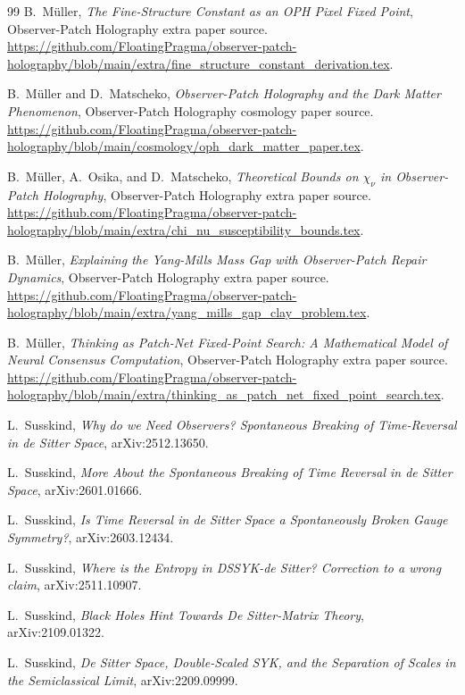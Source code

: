 \documentclass[11pt]{article}
\theoremstyle{remark}
\theoremstyle{plain}
\begin{document}
\begin{thebibliography}{99}
B.\ M\"uller,
\emph{The Fine-Structure Constant as an OPH Pixel Fixed Point},
Observer-Patch Holography extra paper source.
\url{https://github.com/FloatingPragma/observer-patch-holography/blob/main/extra/fine_structure_constant_derivation.tex}.

B.\ M\"uller and D.\ Matscheko,
\emph{Observer-Patch Holography and the Dark Matter Phenomenon},
Observer-Patch Holography cosmology paper source.
\url{https://github.com/FloatingPragma/observer-patch-holography/blob/main/cosmology/oph_dark_matter_paper.tex}.

B.\ M\"uller, A.\ Osika, and D.\ Matscheko,
\emph{Theoretical Bounds on \(\chi_\nu\) in Observer-Patch Holography},
Observer-Patch Holography extra paper source.
\url{https://github.com/FloatingPragma/observer-patch-holography/blob/main/extra/chi_nu_susceptibility_bounds.tex}.

B.\ M\"uller,
\emph{Explaining the Yang-Mills Mass Gap with Observer-Patch Repair Dynamics},
Observer-Patch Holography extra paper source.
\url{https://github.com/FloatingPragma/observer-patch-holography/blob/main/extra/yang_mills_gap_clay_problem.tex}.

B.\ M\"uller,
\emph{Thinking as Patch-Net Fixed-Point Search: A Mathematical Model of Neural Consensus Computation},
Observer-Patch Holography extra paper source.
\url{https://github.com/FloatingPragma/observer-patch-holography/blob/main/extra/thinking_as_patch_net_fixed_point_search.tex}.

L.\ Susskind,
\emph{Why do we Need Observers? Spontaneous Breaking of Time-Reversal in de Sitter Space},
arXiv:2512.13650.

L.\ Susskind,
\emph{More About the Spontaneous Breaking of Time Reversal in de Sitter Space},
arXiv:2601.01666.

L.\ Susskind,
\emph{Is Time Reversal in de Sitter Space a Spontaneously Broken Gauge Symmetry?},
arXiv:2603.12434.

L.\ Susskind,
\emph{Where is the Entropy in DSSYK-de Sitter? Correction to a wrong claim},
arXiv:2511.10907.

L.\ Susskind,
\emph{Black Holes Hint Towards De Sitter-Matrix Theory},
arXiv:2109.01322.

L.\ Susskind,
\emph{De Sitter Space, Double-Scaled SYK, and the Separation of Scales in the Semiclassical Limit},
arXiv:2209.09999.


\end{thebibliography}
\end{document}
